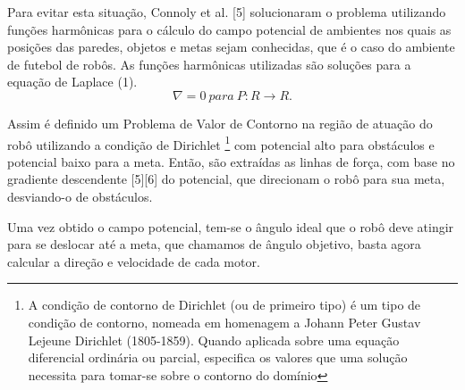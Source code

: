 Para evitar esta situa{\c c}{\~a}o, Connoly et al. [5] solucionaram
o problema utilizando fun{\c c}ões harm{\^o}nicas para o c{\'a}lculo do
campo potencial de ambientes nos quais as posi{\c c}ões das
paredes, objetos e metas sejam conhecidas, que {\'e} o caso do
ambiente de futebol de rob{\^o}s. As fun{\c c}ões harm{\^o}nicas
utilizadas s{\~a}o solu{\c c}ões para a equa{\c c}{\~a}o de Laplace (1).
\begin{equation}
\nabla = 0 \ para \ P : R \rightarrow R .
\end{equation}

Assim {\'e} definido um Problema de Valor de Contorno na
regi{\~a}o de atua{\c c}{\~a}o do rob{\^o} utilizando a condi{\c c}{\~a}o de Dirichlet%
\footnote{A condição de contorno de Dirichlet (ou de primeiro tipo) é um tipo
de condição de contorno, nomeada em homenagem a Johann Peter
Gustav Lejeune Dirichlet (1805-1859). Quando aplicada sobre uma
equação diferencial ordinária ou parcial, especifica os valores que uma
solução necessita para tomar-se sobre o contorno do domínio
}
com potencial alto para obst{\'a}culos e potencial baixo para a
meta. Ent{\~a}o, s{\~a}o extra{\'i}das as linhas de for{\c c}a, com base no
gradiente descendente [5][6] do potencial, que direcionam o
rob{\^o} para sua meta, desviando-o de obst{\'a}culos.

Uma vez obtido o campo potencial, tem-se o {\^a}ngulo ideal
que o rob{\^o} deve atingir para se deslocar at{\'e} a meta, que
chamamos de {\^a}ngulo objetivo, basta agora calcular a dire{\c c}{\~a}o e
velocidade de cada motor. 
